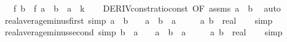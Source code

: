 \begin{isabellebody}
\ \ \ {\isachardoublequoteopen}{\isacharparenleft}{\kern0pt}f\ b\ {\isacharminus}{\kern0pt}\ f\ a{\isacharparenright}{\kern0pt}\ {\isacharslash}{\kern0pt}\ {\isacharparenleft}{\kern0pt}b\ {\isacharminus}{\kern0pt}\ a{\isacharparenright}{\kern0pt}\ {\isacharequal}{\kern0pt}\ k{\isachardoublequoteclose}\isanewline
%
\isadelimproof
\ \ %
\endisadelimproof
%
\isatagproof
{}\isamarkupfalse%
\ DERIV{\isacharunderscore}{\kern0pt}const{\isacharunderscore}{\kern0pt}ratio{\isacharunderscore}{\kern0pt}const\ {\isacharbrackleft}{\kern0pt}OF\ assms{\isacharbrackright}{\kern0pt}\ {\isacartoucheopen}a\ {\isasymnoteq}\ b{\isacartoucheclose}\ \isamarkupfalse%
\ auto%
\endisatagproof
{\isafoldproof}%
%
\isadelimproof
\isanewline
%
\endisadelimproof
\isanewline
{}\isamarkupfalse%
\ real{\isacharunderscore}{\kern0pt}average{\isacharunderscore}{\kern0pt}minus{\isacharunderscore}{\kern0pt}first\ {\isacharbrackleft}{\kern0pt}simp{\isacharbrackright}{\kern0pt}{\isacharcolon}{\kern0pt}\ {\isachardoublequoteopen}{\isacharparenleft}{\kern0pt}a\ {\isacharplus}{\kern0pt}\ b{\isacharparenright}{\kern0pt}\ {\isacharslash}{\kern0pt}\ {}\ {\isacharminus}{\kern0pt}\ a\ {\isacharequal}{\kern0pt}\ {\isacharparenleft}{\kern0pt}b\ {\isacharminus}{\kern0pt}\ a{\isacharparenright}{\kern0pt}\ {\isacharslash}{\kern0pt}\ {}{\isachardoublequoteclose}\isanewline
\ \ \ a\ b\ {\isacharcolon}{\kern0pt}{\isacharcolon}{\kern0pt}\ real\isanewline
%
\isadelimproof
\ \ %
\endisadelimproof
%
\isatagproof
{}\isamarkupfalse%
\ simp%
\endisatagproof
{\isafoldproof}%
%
\isadelimproof
\isanewline
%
\endisadelimproof
\isanewline
{}\isamarkupfalse%
\ real{\isacharunderscore}{\kern0pt}average{\isacharunderscore}{\kern0pt}minus{\isacharunderscore}{\kern0pt}second\ {\isacharbrackleft}{\kern0pt}simp{\isacharbrackright}{\kern0pt}{\isacharcolon}{\kern0pt}\ {\isachardoublequoteopen}{\isacharparenleft}{\kern0pt}b\ {\isacharplus}{\kern0pt}\ a{\isacharparenright}{\kern0pt}\ {\isacharslash}{\kern0pt}\ {}\ {\isacharminus}{\kern0pt}\ a\ {\isacharequal}{\kern0pt}\ {\isacharparenleft}{\kern0pt}b\ {\isacharminus}{\kern0pt}\ a{\isacharparenright}{\kern0pt}\ {\isacharslash}{\kern0pt}\ {}{\isachardoublequoteclose}\isanewline
\ \ \ a\ b\ {\isacharcolon}{\kern0pt}{\isacharcolon}{\kern0pt}\ real\isanewline
%
\isadelimproof
\ \ %
\endisadelimproof
%
\isatagproof
{}\isamarkupfalse%
\ simp%
\endisatagproof
{\isafoldproof}%
%
\isadelimproof
%
\endisadelimproof

\end{isabellebody}
